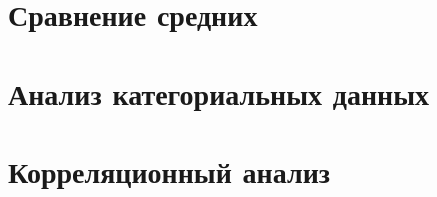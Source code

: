 \documentclass[
  letterpaper,
  DIV=11,
  numbers=noendperiod]{scrreprt}
\newcommand{\const}{\text{const}}
\newcommand{\lp}{\left(}
\newcommand{\rp}{\right)}
\newcommand{\lb}{\left[}
\newcommand{\rb}{\right]}
\newcommand*\circled[1]{\tikz[baseline=(char.base)]{
            \node[shape=circle,draw,inner sep=2pt] (char) {#1};}}
\newcommand{\xor}{\,\text{XOR}\,}
\newcommand{\setN}{\mathbb{N}}
\newcommand{\setNo}{\mathbb{N}_{0}}
\newcommand{\setZ}{\mathbb{Z}}
\newcommand{\setQ}{\mathbb{Q}}
\newcommand{\setR}{\mathbb{R}}
\newcommand{\setC}{\mathbb{C}}
\newcommand{\vm}[1]{\mathbf{#1}} %
\newcommand{\prob}{\mathbb{P}}
\newcommand{\expect}{\mathbb{E}}
\newcommand{\disp}{\mathbb{D}}
\newcommand{\var}{\mathrm{var}}
\newcommand{\cov}{\mathrm{cov}}
\newcommand{\cor}{\mathrm{cor}}
\newcommand{\se}{\mathrm{se}}
\newcommand{\sd}{\mathrm{sd}}
\newcommand{\iid}{\text{i.i.d}}
\newcommand{\Cline}[2][red]{{\sbox\MBox{$#2$}%
  \rlap{\usebox\MBox}\color{#1}\rule[-1.2\dp\MBox]{\wd\MBox}{0.5pt}}}
\newcommand{\norm}{\mathcal{N}}
\newcommand{\def}{\overset{\text{def}}{=}}
\newcommand{\sgn}{\mathrm{sgn}}
\newcommand{\artanh}{\text{artanh}}
\theoremstyle{definition}
\theoremstyle{remark}
\begin{document}

\chapter{Сравнение средних}\label{andan-ttest}


\chapter{Анализ категориальных данных}\label{andan-chisq}


\chapter{Корреляционный анализ}\label{andan-corr}

\usepackage{xcolor}
\usepackage{soul}
\usepackage{amsmath, amsfonts}

\newcommand{\const}{\text{const}}
\newcommand{\lp}{\left(}
\newcommand{\rp}{\right)}
\newcommand{\lb}{\left[}
\newcommand{\rb}{\right]}

\newcommand*\circled[1]{\tikz[baseline=(char.base)]{
            \node[shape=circle,draw,inner sep=2pt] (char) {#1};}}

\newcommand{\xor}{\,\text{XOR}\,}

\newcommand{\setN}{\mathbb{N}}
\newcommand{\setNo}{\mathbb{N}_{0}}
\newcommand{\setZ}{\mathbb{Z}}
\newcommand{\setQ}{\mathbb{Q}}
\newcommand{\setR}{\mathbb{R}}
\newcommand{\setC}{\mathbb{C}}

\newcommand{\vm}[1]{\mathbf{#1}}

\newcommand{\Falg}{\mathcal{F}}
\newcommand{\prob}{\mathbb{P}}
\newcommand{\expect}{\mathbb{E}}
\newcommand{\disp}{\mathbb{D}}
\newcommand{\var}{\text{var}}
\newcommand{\cov}{\text{cov}}
\newcommand{\cor}{\text{cor}}
\newcommand{\se}{\text{se}}
\newcommand{\sd}{\text{sd}}
\newcommand{\iid}{\text{i.i.d}}

\newsavebox{\MBox}
\newcommand{\Cline}[2][red]{{\sbox\MBox{$#2$}%
  \rlap{\usebox\MBox}\color{#1}\rule[-1.2\dp\MBox]{\wd\MBox}{0.5pt}}}

\newcommand{\norm}{\mathcal{N}}

\newcommand{\def}{\overset{\text{def}}{=}}
\newcommand{\sgn}{\text{sgn}}

\usepackage{amsmath}
\DeclareMathOperator\artanh{artanh}
\end{document}
